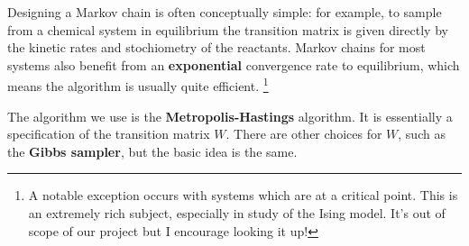 \documentclass[11pt]{article}
\begin{document}
Designing a Markov chain is often conceptually simple: for example, to sample
from a chemical system in equilibrium the transition matrix is given directly by
the kinetic rates and stochiometry of the reactants. Markov chains for most
systems also benefit from an \textbf{exponential} convergence rate to equilibrium,
which means the algorithm is usually quite efficient. \footnote{A notable exception occurs with systems which are at a critical point.
This is an extremely rich subject, especially in study of the Ising model. It's
out of scope of our project but I encourage looking it up!}

The algorithm we use is the \textbf{Metropolis-Hastings} algorithm. It is essentially a
specification of the transition matrix \(W\). There are other choices for \(W\),
such as the \textbf{Gibbs sampler}, but the basic idea is the same.
\end{document}
